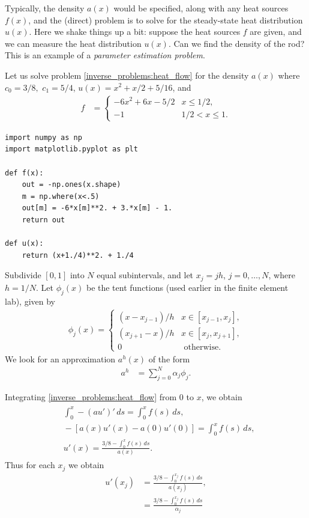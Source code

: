 Typically, the density $a(x)$ would be specified, along with any heat sources $f(x)$, and the (direct) problem is to solve for the steady-state heat distribution $u(x)$. Here we shake things up a bit: suppose the heat sources $f$ are given, and we can measure the heat distribution $u(x)$. Can we find the density of the rod? This is an example of a \textit{parameter estimation problem}.

Let us solve problem \eqref{inverse_problems:heat_flow} for the density $a(x)$ where 
$c_0 = 3/8,$ $c_1 = 5/4$, $u(x) = x^2 + x/2 + 5/16$, and 
\begin{align*}
	f &= \begin{cases}
		-6x^2 + 6x - 5/2 & x \leq 1/2,\\
		-1 & 1/2 < x \leq 1.
	\end{cases}
\end{align*}

\begin{lstlisting}
import numpy as np
import matplotlib.pyplot as plt

def f(x):
	out = -np.ones(x.shape)
	m = np.where(x<.5)
	out[m] = -6*x[m]**2. + 3.*x[m] - 1.
	return out

def u(x):
	return (x+1./4)**2. + 1./4

\end{lstlisting}

Subdivide $[0,1]$ into $N$ equal subintervals, and let $x_j = jh$, $j = 0, \ldots,N$, where $h = 1/N$.
Let $\phi_j(x)$ be the tent functions (used earlier in the finite element lab), given by 
\begin{align*}
	\phi_j(x) = \begin{cases}
(x - x_{j-1})/h  &  x \in [x_{j-1},x_j],\\
 (x_{j+1} - x)/h  &  x \in [x_{j},x_{j+1}],\\
0 & \text{ otherwise.}
\end{cases}
\end{align*}
We look for an approximation $a^h(x)$ of the form 
\begin{align*}
	a^h &= \sum_{j=0}^N \alpha_j \phi_j.
\end{align*}

Integrating \eqref{inverse_problems:heat_flow} from $0$ to $x$, we obtain
\begin{align}
\begin{split}
&{} \int_0^x -(au')'\, ds = \int_0^x f(s)\, ds,\\
&{} -[a(x)u'(x) - a(0)u'(0)] = \int_0^x f(s)\, ds,\\
&{} u'(x) = \frac{3/8 - \int_0^x f(s)\, ds}{a(x)}.
\end{split}
\end{align}
Thus for each $x_j$ we obtain
\begin{align*}
	u'(x_j) &= \frac{3/8 - \int_0^{x_j} f(s)\, ds}{a(x_j)},\\
	&= \frac{3/8 - \int_0^{x_j} f(s)\, ds}{\alpha_j}
\end{align*}

